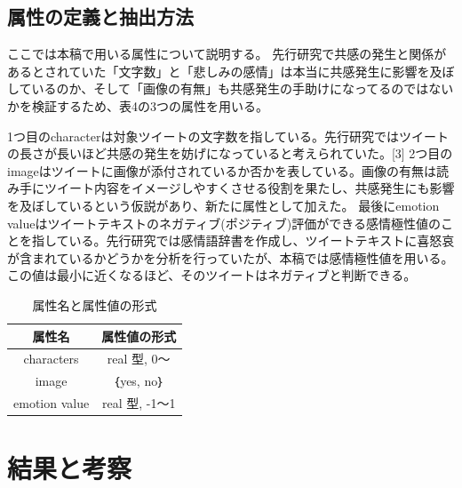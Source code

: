 \documentclass[dvipdfmx]{issj}
\begin{document}
\subsection{属性の定義と抽出方法}  %
ここでは本稿で用いる属性について説明する。
先行研究で共感の発生と関係があるとされていた「文字数」と「悲しみの感情」は本当に共感発生に影響を及ぼしているのか、そして「画像の有無」も共感発生の手助けになってるのではないかを検証するため、表4の3つの属性を用いる。

1つ目のcharacterは対象ツイートの文字数を指している。先行研究ではツイートの長さが長いほど共感の発生を妨げになっていると考えられていた。[3]
2つ目のimageはツイートに画像が添付されているか否かを表している。画像の有無は読み手にツイート内容をイメージしやすくさせる役割を果たし、共感発生にも影響を及ぼしているという仮説があり、新たに属性として加えた。
最後にemotion valueはツイートテキストのネガティブ(ポジティブ)評価ができる感情極性値のことを指している。先行研究では感情語辞書を作成し、ツイートテキストに喜怒哀が含まれているかどうかを分析を行っていたが、本稿では感情極性値を用いる。この値は最小に近くなるほど、そのツイートはネガティブと判断できる。





\begin{table}[t]\centering
\caption{属性名と属性値の形式}\label{tbl:font}
\begin{small}
\begin{tabular}{|c|c|} \hline
属性名            & 属性値の形式\\\hline\hline
characters         & real 型, 0～\\\hline
image & ｛yes, no｝\\\hline
emotion value     &  real 型, -1～1\\\hline
\end{tabular}
\end{small}
\end{table}



\section{結果と考察}  %
\end{document}
